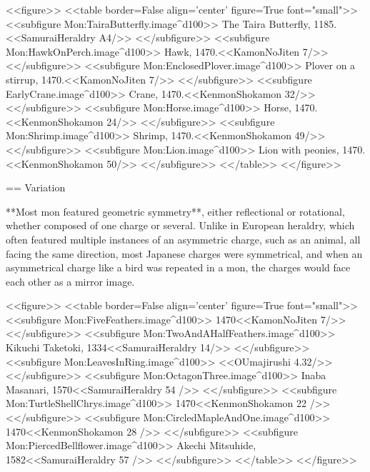   <<figure>>
  <<table border=False align='center' figure=True font="small">>
  <<subfigure Mon:TairaButterfly.image^d100>>
    \label{butterfly} The Taira Butterfly, 1185.<<SamuraiHeraldry A4/>>
  <</subfigure>>
  <<subfigure Mon:HawkOnPerch.image^d100>>
    \label{hawk}Hawk, 1470.<<KamonNoJiten 7/>>
  <</subfigure>>
  <<subfigure Mon:EnclosedPlover.image^d100>>
    \label{plover}Plover on a stirrup, 1470.<<KamonNoJiten 7/>>
  <</subfigure>>
  <<subfigure EarlyCrane.image^d100>>
    \label{crane}Crane, 1470.<<KenmonShokamon 32/>>
  <</subfigure>>
  <<subfigure Mon:Horse.image^d100>>
    \label{horse}Horse, 1470.<<KenmonShokamon 24/>>
  <</subfigure>>
  <<subfigure Mon:Shrimp.image^d100>>
    \label{shrimp}Shrimp, 1470.<<KenmonShokamon 49/>>
  <</subfigure>>
  <<subfigure Mon:Lion.image^d100>>
    \label{lion}Lion with peonies, 1470.<<KenmonShokamon 50/>>
  <</subfigure>>
  <</table>>
  <</figure>>

  == Variation

  **Most mon featured geometric symmetry**, either reflectional or
  rotational, whether composed of one charge or several.  Unlike in
  European heraldry, which often featured multiple instances of an asymmetric
  charge, such as an animal, all facing the same direction, most Japanese
  charges were symmetrical, and when an asymmetrical charge like
  a bird was repeated in a mon, the charges would face each other as
  a mirror image.

  <<figure>>
  <<table border=False align='center' figure=True font="small">>
  <<subfigure Mon:FiveFeathers.image^d100>>
    \label{feathers}1470<<KamonNoJiten 7/>>
  <</subfigure>>
  <<subfigure Mon:TwoAndAHalfFeathers.image^d100>>
    \label{half}Kikuchi Taketoki, 1334<<SamuraiHeraldry 14/>>
  <</subfigure>>
  <<subfigure Mon:LeavesInRing.image^d100>>
    \label{ring}<<OUmajirushi 4.32/>>
  <</subfigure>>
  <<subfigure Mon:OctagonThree.image^d100>>
    \label{octo}Inaba Masanari, 1570<<SamuraiHeraldry 54 />>
  <</subfigure>>
  <<subfigure Mon:TurtleShellChrys.image^d100>>
    \label{turtle}1470<<KenmonShokamon 22 />>
  <</subfigure>>
  <<subfigure Mon:CircledMapleAndOne.image^d100>>
    \label{ringplus}1470<<KenmonShokamon 28 />>
  <</subfigure>>
  <<subfigure Mon:PiercedBellflower.image^d100>>
    \label{pierce}Akechi Mitsuhide, 1582<<SamuraiHeraldry 57 />>
  <</subfigure>>
  <</table>>
  <</figure>>

